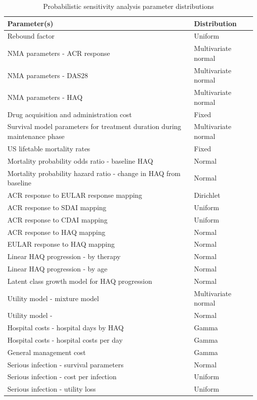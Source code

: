 \documentclass[11pt,final,fleqn]{article}\usepackage[]{graphicx}\usepackage[]{color}
\theoremstyle{plain}
\begin{document}
\begin{table}[!ht] 
\begin{center}
\begin{threeparttable}
\caption{Probabilistic sensitivity analysis parameter distributions} \label{tbl:psa-dists}
\def\arraystretch{1.5}
\begin{tabularx}{\textwidth}{@{\extracolsep{\fill}}p{.65 \linewidth}p{.35 \linewidth}}
\hline
\multicolumn{1}{l}{Parameter(s)} & \multicolumn{1}{l}{Distribution} \\
\hline
Rebound factor & Uniform\\
NMA parameters - ACR response & Multivariate normal \\
NMA parameters - DAS28 & Multivariate normal \\
NMA parameters - HAQ & Multivariate normal \\
Drug acquisition and administration cost & Fixed \\
Survival model parameters for treatment duration during maintenance phase & Multivariate normal \\
US lifetable mortality rates & Fixed \\
Mortality probability odds ratio - baseline HAQ & Normal \\
Mortality probability hazard ratio - change in HAQ from baseline & Normal\\
ACR response to EULAR response mapping & Dirichlet \\
ACR response to SDAI mapping & Uniform \\
ACR response to CDAI mapping & Uniform \\
ACR response to HAQ mapping & Normal \\
EULAR response to HAQ mapping & Normal \\
Linear HAQ progression - by therapy & Normal \\
Linear HAQ progression - by age & Normal \\
Latent class growth model for HAQ progression & Normal \\
Utility model - \cite{alava2013relationship} mixture model & Multivariate normal \\
Utility model - \citet{wailoo2006modeling} & Normal \\
Hospital costs - hospital days by HAQ & Gamma \\
Hospital costs - hospital costs per day & Gamma \\
General management cost & Gamma \\
Serious infection - survival parameters & Normal \\
Serious infection - cost per infection & Uniform \\
Serious infection - utility loss & Uniform \\
\hline
\end{tabularx}
\scriptsize
\end{threeparttable}
\end{center}
\end{table}
\end{document}
